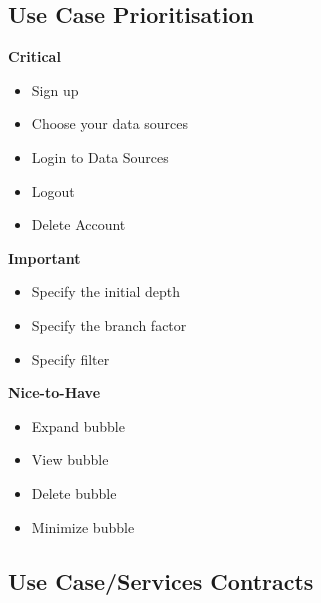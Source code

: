 \documentclass[hidelinks,english]{article}
\begin{document}
		\subsection{Use Case Prioritisation}
			\textbf{Critical}
			\begin{itemize}
			    \item Sign up
			    \item Choose your data sources
			    \item Login to Data Sources
			    \item Logout
			    \item Delete Account
			\end{itemize}
			\textbf{Important}
			\begin{itemize}
			    \item Specify the initial depth
			    \item Specify the branch factor
			    \item Specify filter
			\end{itemize}
			\textbf{Nice-to-Have}
			\begin{itemize}
			    \item Expand bubble
			    \item View bubble
			    \item Delete bubble
			    \item Minimize bubble
			\end{itemize}
		\subsection{Use Case/Services Contracts}
		
\end{document}
